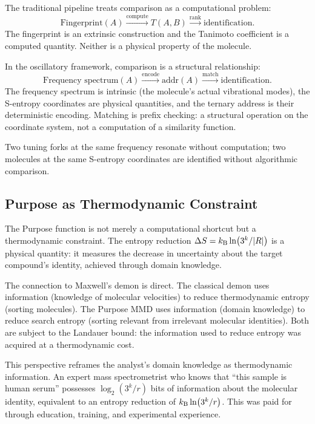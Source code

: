 The traditional pipeline treats comparison as a computational problem:
\begin{equation}
  \text{Fingerprint}(A) \xrightarrow{\text{compute}} T(A,B)
  \xrightarrow{\text{rank}} \text{identification.}
\end{equation}
The fingerprint is an extrinsic construction and the Tanimoto coefficient is
a computed quantity.  Neither is a physical property of the molecule.

In the oscillatory framework, comparison is a structural relationship:
\begin{equation}
  \text{Frequency spectrum}(A) \xrightarrow{\text{encode}}
  \mathrm{addr}(A) \xrightarrow{\text{match}} \text{identification.}
\end{equation}
The frequency spectrum is intrinsic (the molecule's actual vibrational modes),
the S-entropy coordinates are physical quantities, and the ternary address is
their deterministic encoding.  Matching is prefix checking: a structural
operation on the coordinate system, not a computation of a similarity function.

Two tuning forks at the same frequency resonate without computation; two
molecules at the same S-entropy coordinates are identified without algorithmic
comparison.

\subsection{Purpose as Thermodynamic Constraint}
\label{sec:ch24-thermo}

The Purpose function is not merely a computational shortcut but a thermodynamic
constraint.  The entropy reduction $\Delta S = k_{\mathrm{B}} \ln(3^k/|R|)$ is a physical
quantity: it measures the decrease in uncertainty about the target compound's
identity, achieved through domain knowledge.

The connection to Maxwell's demon is direct.  The classical demon uses
information (knowledge of molecular velocities) to reduce thermodynamic entropy
(sorting molecules).  The Purpose MMD uses information (domain knowledge) to
reduce search entropy (sorting relevant from irrelevant molecular identities).
Both are subject to the Landauer bound: the information used to reduce entropy
was acquired at a thermodynamic cost.

This perspective reframes the analyst's domain knowledge as thermodynamic
information.  An expert mass spectrometrist who knows that ``this sample is
human serum'' possesses $\log_2(3^k/r)$ bits of information about the molecular
identity, equivalent to an entropy reduction of $k_{\mathrm{B}} \ln(3^k/r)$.  This was
paid for through education, training, and experimental experience.

